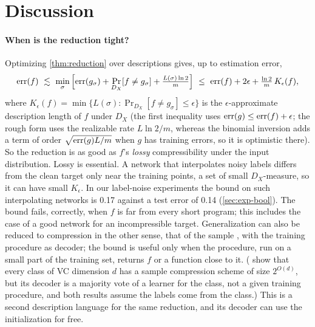 \section{Discussion}\label{sec:discussion}

\paragraph{When is the reduction tight?} Optimizing \cref{thm:reduction} over descriptions gives, up to estimation error,
\[
\err(f)\ \lesssim\ \min_\sigma\Big[\err(g_\sigma)+\Pr_{D_X}[f\ne g_\sigma]+\tfrac{L(\sigma)\ln 2}{m}\Big]\ \le\ \err(f)+2\epsilon+\tfrac{\ln 2}{m}\,K_\epsilon(f),
\]
where $K_\epsilon(f)=\min\{L(\sigma):\Pr_{D_X}[f\ne g_\sigma]\le\epsilon\}$ is the $\epsilon$-approximate description length of $f$ under $D_X$ (the first inequality uses $\mathrm{err}(g)\le\mathrm{err}(f)+\epsilon$; the rough form uses the realizable rate $L\ln2/m$, whereas the binomial inversion adds a term of order $\sqrt{\mathrm{err}(g)L/m}$ when $g$ has training errors, so it is optimistic there). So the reduction is as good as $f$'s \emph{lossy} compressibility under the input distribution. Lossy is essential. A network that interpolates noisy labels differs from the clean target only near the training points, a set of small $D_X$-measure, so it can have small $K_\epsilon$. In our label-noise experiments the bound on such interpolating networks is 0.17 against a test error of 0.14 (\cref{sec:exp-bool}). The bound fails, correctly, when $f$ is far from every short program; this includes the case of a good network for an incompressible target. Generalization can also be reduced to compression in the other sense, that of the sample \citep{littlestone1986relating}, with the training procedure as decoder; the bound is useful only when the procedure, run on a small part of the training set, returns $f$ or a function close to it. (\citet{moran2016sample} show that every class of VC dimension $d$ has a sample compression scheme of size $2^{O(d)}$, but its decoder is a majority vote of a learner for the class, not a given training procedure, and both results assume the labels come from the class.) This is a second description language for the same reduction, and its decoder can use the initialization for free.

